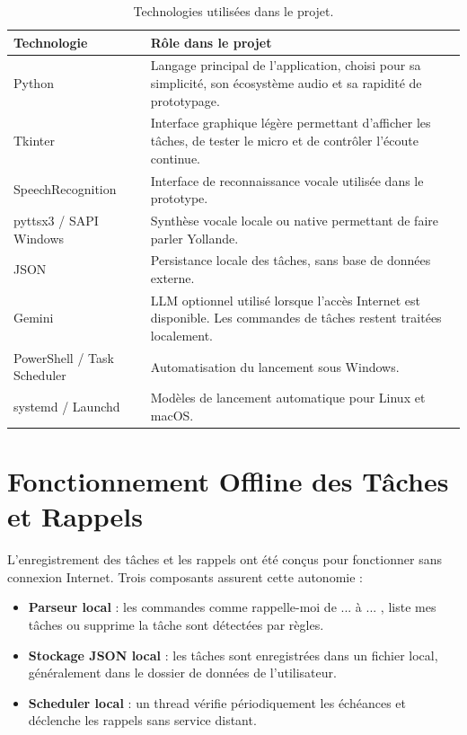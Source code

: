 \documentclass[12pt,a4paper]{report}
\begin{document}
\begin{table}[H]
  \centering
  \begin{tabular}{p{4cm} p{9cm}}
    \toprule
    \textbf{Technologie} & \textbf{Rôle dans le projet} \\
    \midrule
    Python & Langage principal de l'application, choisi pour sa simplicité, son écosystème audio et sa rapidité de prototypage. \\
    Tkinter & Interface graphique légère permettant d'afficher les tâches, de tester le micro et de contrôler l'écoute continue. \\
    SpeechRecognition & Interface de reconnaissance vocale utilisée dans le prototype. \\
    pyttsx3 / SAPI Windows & Synthèse vocale locale ou native permettant de faire parler Yollande. \\
    JSON & Persistance locale des tâches, sans base de données externe. \\
    Gemini & LLM optionnel utilisé lorsque l'accès Internet est disponible. Les commandes de tâches restent traitées localement. \\
    PowerShell / Task Scheduler & Automatisation du lancement sous Windows. \\
    systemd / Launchd & Modèles de lancement automatique pour Linux et macOS. \\
    \bottomrule
  \end{tabular}
  \caption{Technologies utilisées dans le projet.}
\end{table}

\chapter{Fonctionnement Offline des Tâches et Rappels}

L'enregistrement des tâches et les rappels ont été conçus pour fonctionner sans
connexion Internet. Trois composants assurent cette autonomie :

\begin{itemize}[label=--]
  \item \textbf{Parseur local} : les commandes comme \og rappelle-moi de ... à ... \fg{},
  \og liste mes tâches \fg{} ou \og supprime la tâche \fg{} sont détectées par règles.
  \item \textbf{Stockage JSON local} : les tâches sont enregistrées dans un fichier local,
  généralement dans le dossier de données de l'utilisateur.
  \item \textbf{Scheduler local} : un thread vérifie périodiquement les échéances et déclenche
  les rappels sans service distant.
\end{itemize}
\end{document}
